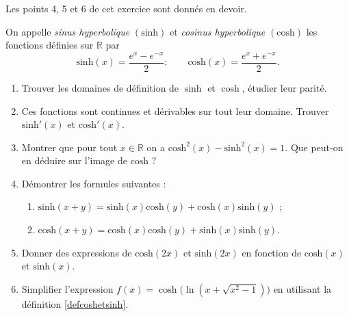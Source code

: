 
\begin{exercice}\label{exostarterST-0015}

  \begin{remark}
    Les points 4, 5 et 6 de cet exercice sont donnés en devoir.
  \end{remark}

On appelle \emph{sinus hyperbolique} $(\text{sinh})$ et \emph{cosinus hyperbolique} $(\text{cosh})$ les fonctions définies sur $\mathbb{R}$ par 
\begin{equation}\label{defcoshetsinh}
  \text{sinh}(x) = \frac{e^x-e^{-x}}{2} ; \qquad  \text{cosh}(x) = \frac{e^x+e^{-x}}{2}. 
\end{equation}
\begin{enumerate}
\item Trouver les domaines de définition de  $\sinh$ et $\cosh$, étudier leur parité. 
\item Ces fonctions sont continues et dérivables sur tout leur domaine. Trouver $\text{sinh}'(x)$ et  $\text{cosh}'(x)$.
\item Montrer que pour tout $x\in\mathbb{R}$ on a  $\text{cosh}^2 (x) - \text{sinh}^2 (x) = 1$. Que peut-on en déduire sur l'image de $\text{cosh}$ ?
\item Démontrer les formules suivantes :
\begin{enumerate}
\item $\text{sinh} (x+y)=\text{sinh}(x) \text{cosh}(y)+\text{cosh}(x)\text{sinh}(y)$ ;
\item $\text{cosh} (x+y)=\text{cosh}(x) \text{cosh}(y)+\text{sinh}(x)\text{sinh}(y)$.
\end{enumerate}
\item Donner des expressions de $\text{cosh}(2x)$ et $\text{sinh}(2x)$  en fonction de $\text{cosh}(x)$ et $\text{sinh}(x)$.
\item Simplifier l'expression $f(x)=\cosh\Big(\ln(x+\sqrt{x^2-1})\Big)$ en utilisant la définition \eqref{defcoshetsinh}.
\end{enumerate}


\end{exercice}

